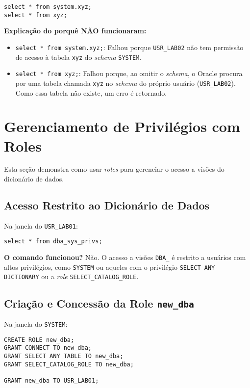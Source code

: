 \documentclass[a4paper, 12pt]{article}
\begin{document}
\begin{lstlisting}
select * from system.xyz;
select * from xyz;
\end{lstlisting}
\textbf{Explicação do porquê NÃO funcionaram:}
\begin{itemize}
	\item \texttt{select * from system.xyz;}: Falhou porque \texttt{USR\_LAB02} não tem permissão de acesso à tabela \texttt{xyz} do \textit{schema} \texttt{SYSTEM}.
	\item \texttt{select * from xyz;}: Falhou porque, ao omitir o \textit{schema}, o Oracle procura por uma tabela chamada \texttt{xyz} no \textit{schema} do próprio usuário (\texttt{USR\_LAB02}). Como essa tabela não existe, um erro é retornado.
\end{itemize}

\section{Gerenciamento de Privilégios com Roles}
Esta seção demonstra como usar \textit{roles} para gerenciar o acesso a visões do dicionário de dados.

\subsection{Acesso Restrito ao Dicionário de Dados}
Na janela do \texttt{USR\_LAB01}:
\begin{lstlisting}
select * from dba_sys_privs;
\end{lstlisting}
\textbf{O comando funcionou?} Não. O acesso a visões \texttt{DBA\_} é restrito a usuários com altos privilégios, como \texttt{SYSTEM} ou aqueles com o privilégio \texttt{SELECT ANY DICTIONARY} ou a \textit{role} \texttt{SELECT\_CATALOG\_ROLE}.

\subsection{Criação e Concessão da Role \texttt{new\_dba}}
Na janela do \texttt{SYSTEM}:
\begin{lstlisting}
CREATE ROLE new_dba;
GRANT CONNECT TO new_dba;
GRANT SELECT ANY TABLE TO new_dba;
GRANT SELECT_CATALOG_ROLE TO new_dba;

GRANT new_dba TO USR_LAB01;
\end{lstlisting}
\end{document}
